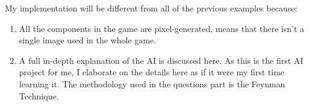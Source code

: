 My implementation will be different from all of the previous examples because:
\begin{enumerate}
\item All the components in the game are pixel-generated, means that there isn't a single image used in the whole game.
\item A full in-depth explanation of the AI is discussed here. As this is the first AI project for me, I elaborate on the details here as if it were my first time learning it. The methodology used in the questions part is the Feynman Technique.
\end{enumerate}



